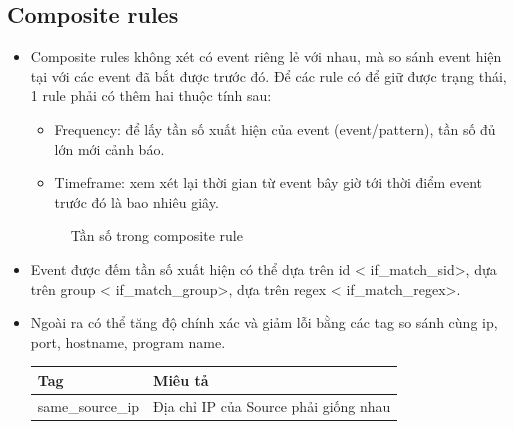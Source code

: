   \subsection{Composite rules}
  \begin{itemize}
    \item  Composite rules không xét có event riêng lẻ với nhau, mà so sánh
    event hiện tại với các event đã bắt được trước đó. Để các rule có để giữ được trạng thái, 1 rule phải có thêm hai thuộc tính sau:
    \begin{itemize}
      \item Frequency: để lấy tần số xuất hiện của event (event/pattern), tần số
      đủ lớn mới cảnh báo.
      \item Timeframe: xem xét lại thời gian từ event bây giờ tới thời điểm
      event trước đó  là bao nhiêu giây.
      \end{itemize}
      \begin{figure}[h!]
	\centering 
{}
	\caption{Tần số trong composite rule}
  \end{figure}
    \item Event được đếm tần số xuất hiện có thể dựa trên id \textless
    if\_match\_sid\textgreater, dựa trên group \textless
    if\_match\_group\textgreater, dựa trên regex \textless
    if\_match\_regex\textgreater.
    \item Ngoài ra có thể tăng độ chính xác và giảm lỗi bằng các tag so sánh
    cùng ip, port, hostname, program name.
     \begin{table}[h]
  	 	\centering
		\begin{tabular}{|p{3cm}|p{10cm}|}
		\hline
		\textbf{Tag} & \textbf{Miêu tả}\\
		 \hline
		 same\_source\_ip & Địa chỉ IP của Source phải giống nhau\\

\end{tabular}
\end{table}
\end{itemize}
